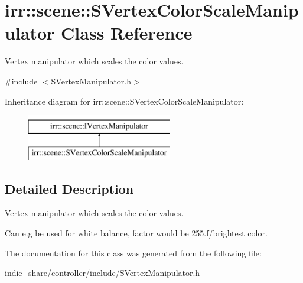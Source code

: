 \hypertarget{classirr_1_1scene_1_1SVertexColorScaleManipulator}{}\section{irr\+:\+:scene\+:\+:S\+Vertex\+Color\+Scale\+Manipulator Class Reference}
\label{classirr_1_1scene_1_1SVertexColorScaleManipulator}


Vertex manipulator which scales the color values.  




{\ttfamily \#include $<$S\+Vertex\+Manipulator.\+h$>$}

Inheritance diagram for irr\+:\+:scene\+:\+:S\+Vertex\+Color\+Scale\+Manipulator\+:\begin{figure}[H]
\begin{center}
\leavevmode
\includegraphics[height=2.000000cm]{classirr_1_1scene_1_1SVertexColorScaleManipulator}
\end{center}
\end{figure}


\subsection{Detailed Description}
Vertex manipulator which scales the color values. 

Can e.\+g be used for white balance, factor would be 255.\+f/brightest color. 

The documentation for this class was generated from the following file\+:\begin{DoxyCompactItemize}
\item 
indie\+\_\+share/controller/include/S\+Vertex\+Manipulator.\+h\end{DoxyCompactItemize}
